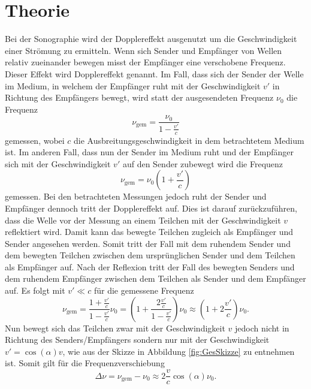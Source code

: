 
\section{Theorie}
\label{sec:Theorie}

Bei der Sonographie wird der Dopplereffekt ausgenutzt um die Geschwindigkeit einer Strömung zu ermitteln.
Wenn sich Sender und Empfänger von Wellen relativ zueinander bewegen misst der Empfänger eine verschobene Frequenz. Dieser Effekt wird Dopplereffekt genannt. Im Fall, dass sich der Sender der Welle im Medium, in welchem der Empfänger ruht mit der Geschwindigkeit $v'$ in Richtung des Empfängers bewegt, wird statt der ausgesendeten Frequenz $\nu_0$ die Frequenz
\begin{equation}
	\nu_\text{gem}=\frac{\nu_0}{1-\frac{v'}{c}}
\end{equation}
gemessen, wobei $c$ die Ausbreitungsgeschwindigkeit in dem betrachtetem Medium ist. Im anderen Fall, dass nun der Sender im Medium ruht und der Empfänger sich mit der Geschwindigkeit $v'$ auf den Sender zubewegt wird die Frequenz
\begin{equation}
	\nu_\text{gem}=\nu_0(1+\frac{v'}{c})
\end{equation}
gemessen. Bei den betrachteten Messungen jedoch ruht der Sender und Empfänger dennoch tritt der Dopplereffekt auf. Dies ist darauf zurückzuführen, dass die Welle vor der Messung an einem Teilchen mit der Geschwindigkeit $v$ reflektiert wird. Damit kann das bewegte Teilchen zugleich als Empfänger und Sender angesehen werden. Somit tritt der Fall mit dem ruhendem Sender und dem bewegten Teilchen zwischen dem ursprünglichen Sender und dem Teilchen als Empfänger auf. Nach der Reflexion tritt der Fall des bewegten Senders und dem ruhendem Empfänger zwischen dem Teilchen als Sender und dem Empfänger auf. Es folgt mit $v' \ll c$ für die gemessene Frequenz
\begin{equation}
	\nu_\text{gem}=\frac{1+\frac{v'}{c}}{1-\frac{v'}{c}} \nu_0=\left(1+\frac{2\frac{v'}{c}}{1-\frac{v'}{c}}\right) \nu_0\approx \left(1+2\frac{v'}{c}\right) \nu_0 \text{.}
\end{equation}
Nun bewegt sich das Teilchen zwar mit der Geschwindigkeit $v$ jedoch nicht in Richtung des Senders/Empfängers sondern nur mit der Geschwindigkeit $v'= \cos(\alpha) v$, wie aus der Skizze in Abbildung \ref{fig:GesSkizze} zu entnehmen ist. Somit gilt für die Frequenzverschiebung
\begin{equation}
	\Delta \nu = \nu_\text{gem}-\nu_0 \approx 2 \frac{v}{c} \cos(\alpha) \nu_0 \text{.}
\end{equation}
